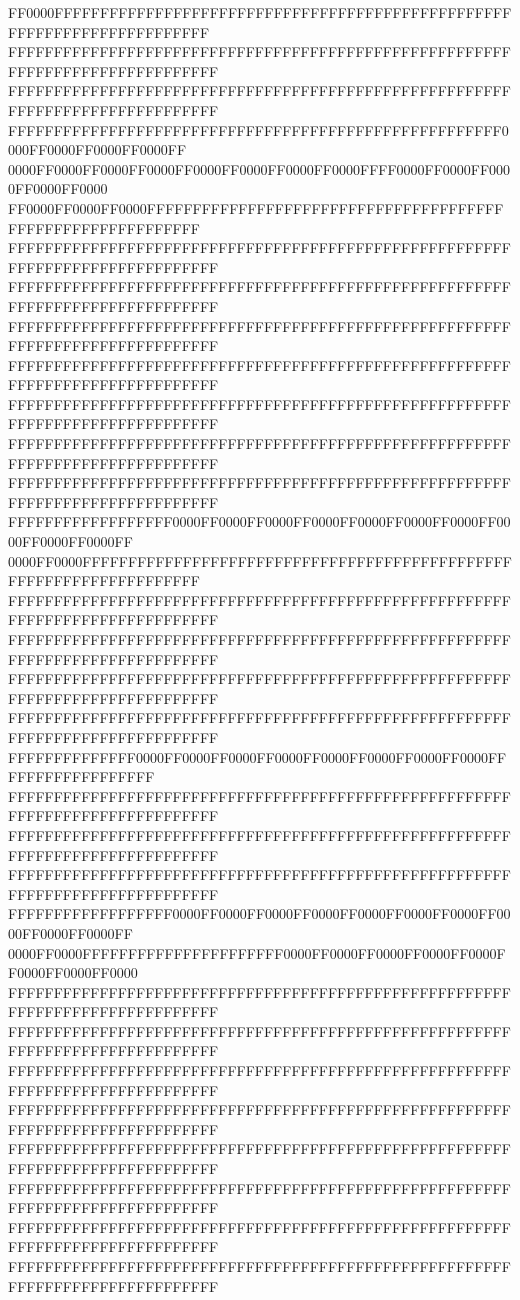 FF0000FFFFFFFFFFFFFFFFFFFFFFFFFFFFFFFFFFFFFFFFFFFFFFFFFFFFFFFFFFFFFFFFFFFFFFFF
FFFFFFFFFFFFFFFFFFFFFFFFFFFFFFFFFFFFFFFFFFFFFFFFFFFFFFFFFFFFFFFFFFFFFFFFFFFFFF
FFFFFFFFFFFFFFFFFFFFFFFFFFFFFFFFFFFFFFFFFFFFFFFFFFFFFFFFFFFFFFFFFFFFFFFFFFFFFF
FFFFFFFFFFFFFFFFFFFFFFFFFFFFFFFFFFFFFFFFFFFFFFFFFFFFFF0000FF0000FF0000FF0000FF
0000FF0000FF0000FF0000FF0000FF0000FF0000FF0000FFFF0000FF0000FF0000FF0000FF0000
FF0000FF0000FF0000FFFFFFFFFFFFFFFFFFFFFFFFFFFFFFFFFFFFFFFFFFFFFFFFFFFFFFFFFFFF
FFFFFFFFFFFFFFFFFFFFFFFFFFFFFFFFFFFFFFFFFFFFFFFFFFFFFFFFFFFFFFFFFFFFFFFFFFFFFF
FFFFFFFFFFFFFFFFFFFFFFFFFFFFFFFFFFFFFFFFFFFFFFFFFFFFFFFFFFFFFFFFFFFFFFFFFFFFFF
FFFFFFFFFFFFFFFFFFFFFFFFFFFFFFFFFFFFFFFFFFFFFFFFFFFFFFFFFFFFFFFFFFFFFFFFFFFFFF
FFFFFFFFFFFFFFFFFFFFFFFFFFFFFFFFFFFFFFFFFFFFFFFFFFFFFFFFFFFFFFFFFFFFFFFFFFFFFF
FFFFFFFFFFFFFFFFFFFFFFFFFFFFFFFFFFFFFFFFFFFFFFFFFFFFFFFFFFFFFFFFFFFFFFFFFFFFFF
FFFFFFFFFFFFFFFFFFFFFFFFFFFFFFFFFFFFFFFFFFFFFFFFFFFFFFFFFFFFFFFFFFFFFFFFFFFFFF
FFFFFFFFFFFFFFFFFFFFFFFFFFFFFFFFFFFFFFFFFFFFFFFFFFFFFFFFFFFFFFFFFFFFFFFFFFFFFF
FFFFFFFFFFFFFFFFFF0000FF0000FF0000FF0000FF0000FF0000FF0000FF0000FF0000FF0000FF
0000FF0000FFFFFFFFFFFFFFFFFFFFFFFFFFFFFFFFFFFFFFFFFFFFFFFFFFFFFFFFFFFFFFFFFFFF
FFFFFFFFFFFFFFFFFFFFFFFFFFFFFFFFFFFFFFFFFFFFFFFFFFFFFFFFFFFFFFFFFFFFFFFFFFFFFF
FFFFFFFFFFFFFFFFFFFFFFFFFFFFFFFFFFFFFFFFFFFFFFFFFFFFFFFFFFFFFFFFFFFFFFFFFFFFFF
FFFFFFFFFFFFFFFFFFFFFFFFFFFFFFFFFFFFFFFFFFFFFFFFFFFFFFFFFFFFFFFFFFFFFFFFFFFFFF
FFFFFFFFFFFFFFFFFFFFFFFFFFFFFFFFFFFFFFFFFFFFFFFFFFFFFFFFFFFFFFFFFFFFFFFFFFFFFF
FFFFFFFFFFFFFF0000FF0000FF0000FF0000FF0000FF0000FF0000FF0000FFFFFFFFFFFFFFFFFF
FFFFFFFFFFFFFFFFFFFFFFFFFFFFFFFFFFFFFFFFFFFFFFFFFFFFFFFFFFFFFFFFFFFFFFFFFFFFFF
FFFFFFFFFFFFFFFFFFFFFFFFFFFFFFFFFFFFFFFFFFFFFFFFFFFFFFFFFFFFFFFFFFFFFFFFFFFFFF
FFFFFFFFFFFFFFFFFFFFFFFFFFFFFFFFFFFFFFFFFFFFFFFFFFFFFFFFFFFFFFFFFFFFFFFFFFFFFF
FFFFFFFFFFFFFFFFFF0000FF0000FF0000FF0000FF0000FF0000FF0000FF0000FF0000FF0000FF
0000FF0000FFFFFFFFFFFFFFFFFFFFFF0000FF0000FF0000FF0000FF0000FF0000FF0000FF0000
FFFFFFFFFFFFFFFFFFFFFFFFFFFFFFFFFFFFFFFFFFFFFFFFFFFFFFFFFFFFFFFFFFFFFFFFFFFFFF
FFFFFFFFFFFFFFFFFFFFFFFFFFFFFFFFFFFFFFFFFFFFFFFFFFFFFFFFFFFFFFFFFFFFFFFFFFFFFF
FFFFFFFFFFFFFFFFFFFFFFFFFFFFFFFFFFFFFFFFFFFFFFFFFFFFFFFFFFFFFFFFFFFFFFFFFFFFFF
FFFFFFFFFFFFFFFFFFFFFFFFFFFFFFFFFFFFFFFFFFFFFFFFFFFFFFFFFFFFFFFFFFFFFFFFFFFFFF
FFFFFFFFFFFFFFFFFFFFFFFFFFFFFFFFFFFFFFFFFFFFFFFFFFFFFFFFFFFFFFFFFFFFFFFFFFFFFF
FFFFFFFFFFFFFFFFFFFFFFFFFFFFFFFFFFFFFFFFFFFFFFFFFFFFFFFFFFFFFFFFFFFFFFFFFFFFFF
FFFFFFFFFFFFFFFFFFFFFFFFFFFFFFFFFFFFFFFFFFFFFFFFFFFFFFFFFFFFFFFFFFFFFFFFFFFFFF
FFFFFFFFFFFFFFFFFFFFFFFFFFFFFFFFFFFFFFFFFFFFFFFFFFFFFFFFFFFFFFFFFFFFFFFFFFFFFF
